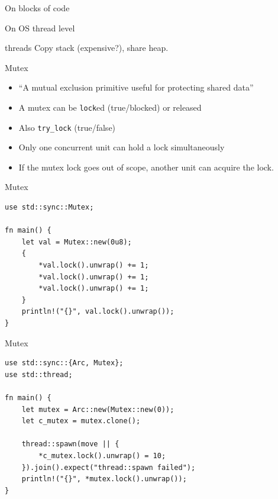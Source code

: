 \documentclass{beamer}
\begin{document}
\begin{frame}[standout]
  On blocks of code
\end{frame}


\begin{frame}[standout]
  On OS thread level
\end{frame}



\begin{frame}[fragile]{threads}
  Copy stack (expensive?), share heap.
\end{frame}

\begin{frame}[fragile]{Mutex}
  \begin{itemize}
    \item \enquote{A mutual exclusion primitive useful for protecting shared data}
    \item A mutex can be \texttt{lock}ed (true/blocked) or released
    \item Also \texttt{try_lock} (true/false)
    \item Only one concurrent unit can hold a lock simultaneously
    \item If the mutex lock goes out of scope, another unit can acquire the lock.
  \end{itemize}
\end{frame}

\begin{frame}[fragile]{Mutex}
  \begin{verbatim}
use std::sync::Mutex;
  
fn main() {
    let val = Mutex::new(0u8);
    {
        *val.lock().unwrap() += 1;
        *val.lock().unwrap() += 1;
        *val.lock().unwrap() += 1;
    }
    println!("{}", val.lock().unwrap());
}
  \end{verbatim}
\end{frame}

\begin{frame}[fragile]{Mutex}
  \begin{verbatim}
use std::sync::{Arc, Mutex};
use std::thread;

fn main() {
    let mutex = Arc::new(Mutex::new(0));
    let c_mutex = mutex.clone();

    thread::spawn(move || {
        *c_mutex.lock().unwrap() = 10;
    }).join().expect("thread::spawn failed");
    println!("{}", *mutex.lock().unwrap());
}
  \end{verbatim}
\end{frame}
\end{document}
